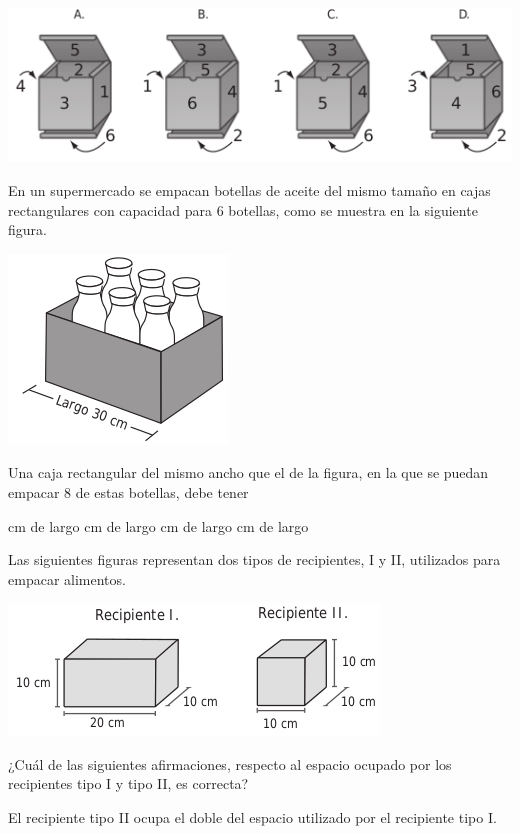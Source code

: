 \documentclass[10pt,letterpaper,addpoints]{exam}
\begin{document}
\begin{multicols}{2}
\begin{questions}
\begin{center}
 \includegraphics[scale=.45]{Images/Pantallazo-4.png} 
 \end{center}
 \question En un supermercado se empacan botellas de aceite del mismo tamaño en cajas rectangulares con capacidad para 6 botellas, como se muestra en la siguiente figura.
 \begin{center}
 \includegraphics[scale=.6]{Images/Pantallazo-5.png} 
 \end{center}
 Una caja rectangular del mismo ancho que el de la figura, en la que se puedan empacar 8 de estas botellas, debe tener
 \begin{choices}
  cm de largo
  cm de largo
  cm de largo
   cm de largo
 \end{choices}
 \question Las siguientes figuras representan dos tipos de recipientes, I y II, utilizados para empacar alimentos.
 \begin{center}
 \includegraphics[scale=.6]{Images/Pantallazo-6.png} 
 \end{center}
 ¿Cuál de las siguientes afirmaciones, respecto al espacio ocupado por los recipientes tipo I y tipo II, es correcta?
 \begin{choices}
 \choice El recipiente tipo II ocupa el doble del espacio utilizado por el recipiente tipo I.

\end{choices}
\end{questions}
\end{multicols}
\end{document}
